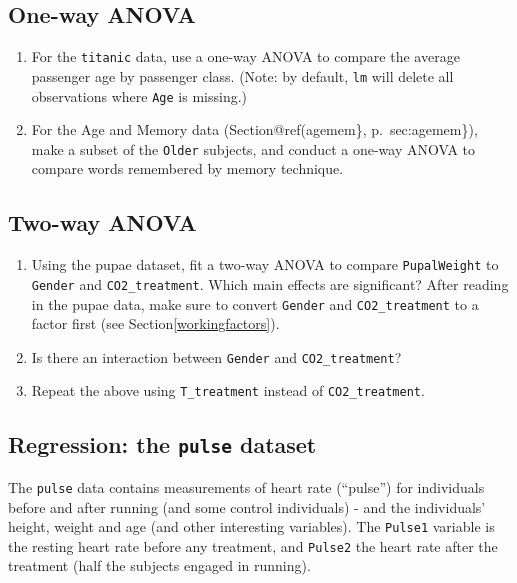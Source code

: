 \documentclass[]{book}
\begin{document}
\hypertarget{one-way-anova}{%
\subsection{One-way ANOVA}\label{one-way-anova}}

\begin{enumerate}
\def\labelenumi{\arabic{enumi}.}
\item
  For the \texttt{titanic} data, use a one-way ANOVA to compare the average passenger age by passenger class. (Note: by default, \texttt{lm} will delete all observations where \texttt{Age} is missing.)
\item
  For the Age and Memory data (Section@ref(agemem\}, p.~sec:agemem\}), make a subset of the \texttt{Older} subjects, and conduct a one-way ANOVA to compare words remembered by memory technique.
\end{enumerate}

\hypertarget{two-way-anova}{%
\subsection{Two-way ANOVA}\label{two-way-anova}}

\begin{enumerate}
\def\labelenumi{\arabic{enumi}.}
\item
  Using the pupae dataset, fit a two-way ANOVA to compare \texttt{PupalWeight} to \texttt{Gender} and \texttt{CO2\_treatment}. Which main effects are significant? After reading in the pupae data, make sure to convert \texttt{Gender} and \texttt{CO2\_treatment} to a factor first (see Section\ref{workingfactors}).
\item
  Is there an interaction between \texttt{Gender} and \texttt{CO2\_treatment}?
\item
  Repeat the above using \texttt{T\_treatment} instead of \texttt{CO2\_treatment}.
\end{enumerate}

\hypertarget{multregexerc}{%
\subsection{\texorpdfstring{Regression: the \texttt{pulse} dataset}{Regression: the pulse dataset}}\label{multregexerc}}

The \texttt{pulse} data contains measurements of heart rate (``pulse'') for individuals before and after running (and some control individuals) - and the individuals' height, weight and age (and other interesting variables). The \texttt{Pulse1} variable is the resting heart rate before any treatment, and \texttt{Pulse2} the heart rate after the treatment (half the subjects engaged in running).
\end{document}
